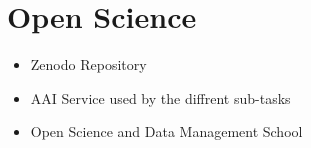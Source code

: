 %
\clearpage
\section{Open Science}
\begin{itemize}
    \item Zenodo Repository 
    \item AAI Service used by the diffrent sub-tasks
    \item Open Science and Data Management School 
\end{itemize}